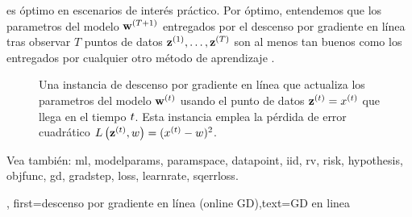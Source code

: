 {{es óptimo en escenarios de interés práctico. Por óptimo, entendemos que los parametros del modelo
${\bf w}^{(T+1)}$ entregados por el descenso por gradiente en línea tras observar $T$ puntos de datos ${\bf z}^{(1)},\ldots, {\bf z}^{(T)}$ 
son al menos tan buenos como los entregados por cualquier otro método de aprendizaje \cite{HazanOCO,GDOptimalRakhlin2012}. 
\begin{figure}[H]
	\begin{center}
\end{center} 
\caption{Una instancia de descenso por gradiente en línea que actualiza los parametros del modelo ${\bf w}^{(t)}$ 
usando el punto de datos ${\bf z}^{(t)} = x^{(t)}$ que llega en el tiempo $t$. 
Esta instancia emplea la pérdida de error cuadrático $L\left({\bf z}^{(t)},w \right) = (x^{(t)} - w)^{2}$.
}
\end{figure}
Vea también: \gls{ml}, \glspl{modelparam}, \gls{paramspace}, \gls{datapoint}, \gls{iid}, \gls{rv}, \gls{risk}, \gls{hypothesis}, \gls{objfunc}, \gls{gd}, \gls{gradstep}, \gls{loss}, \gls{learnrate}, \gls{sqerrloss}.},
first={descenso por gradiente en línea (online GD)},text={GD en linea}}

